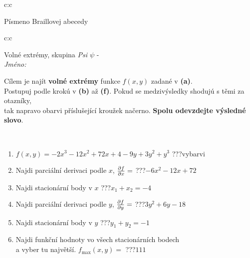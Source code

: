 \documentclass[10pt]{report}
\begin{document}
\begin{tabular}{c:c}
\begin{minipage}[c][104.5mm][t]{0.5\linewidth}
\begin{center}
\begin{minipage}{0.20\linewidth}
\begin{center}
{\small Písmeno Braillovej abecedy}
\end{center}
\end{minipage}
\end{center}
\end{minipage}
%
\end{tabular}
\newpage
\thispagestyle{empty}
\begin{tabular}{c:c}
\begin{minipage}[c][104.5mm][t]{0.5\linewidth}
\begin{center}
\vspace{7mm}
{\huge Volné extrémy, skupina \textit{Psi $\psi$} -}\\[5mm]
\textit{Jméno:}\phantom{xxxxxxxxxxxxxxxxxxxxxxxxxxxxxxxxxxxxxxxxxxxxxxxxxxxxxxxxxxxxxxxxx}\\[5mm]
\begin{minipage}{0.95\linewidth}
\begin{center}
Cílem je najít \textbf{volné extrémy} funkce $f(x,y)$ zadané v \textbf{(a)}.\\Postupuj podle krokú v \textbf{(b)} až \textbf{(f)}. Pokud se medzivýsledky shodujú s těmi za otazníky,\\tak napravo obarvi příslušející kroužek načerno. \textbf{Spolu odevzdejte výsledné slovo}.
\end{center}
\end{minipage}
\\[1mm]
\begin{minipage}{0.79\linewidth}
\begin{center}
\begin{varwidth}{\linewidth}
\begin{enumerate}
\normalsize
\item $f(x,y)=-2x^3-12x^2+72x+4-9y+3y^2+y^3$\quad \dotfill\; ???\;\dotfill \quad vybarvi
\item Najdi parciální derivaci podle $x$, $\pdv{f}{x}=$\quad \dotfill\; ???\;\dotfill \quad $-6x^2-12x+72$
\item Najdi stacionární body v $x$\quad \dotfill\; ???\;\dotfill \quad $x_1+x_2=-4$
\item Najdi parciální derivaci podle $y$, $\pdv{f}{y}=$\quad \dotfill\; ???\;\dotfill \quad $3y^2+6y-18$
\item Najdi stacionární body v $y$\quad \dotfill\; ???\;\dotfill \quad $y_1+y_2=-1$
\item Najdi funkční hodnoty vo všech stacionárních bodech \\ \phantom{xxxxxx} a vyber tu najvětší. $f_{\text{max}}(x,y)=$\quad \dotfill\; ???\;\dotfill \quad $111$

\end{enumerate}
\end{varwidth}
\end{center}
\end{minipage}
\end{center}
\end{minipage}
\end{tabular}
\end{document}

